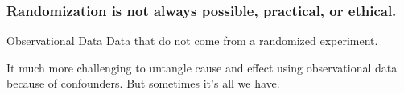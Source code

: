 %
%
\begin{frame}
\frametitle{Randomization is not always possible, practical, or ethical.}

\begin{block}{Observational Data}
Data that do not come from a randomized experiment.

\end{block}
\vspace{2em}
\begin{alertblock}{It much more challenging to untangle cause and effect using observational data because of confounders. But sometimes it's all we have.}
\end{alertblock}


\end{frame}


